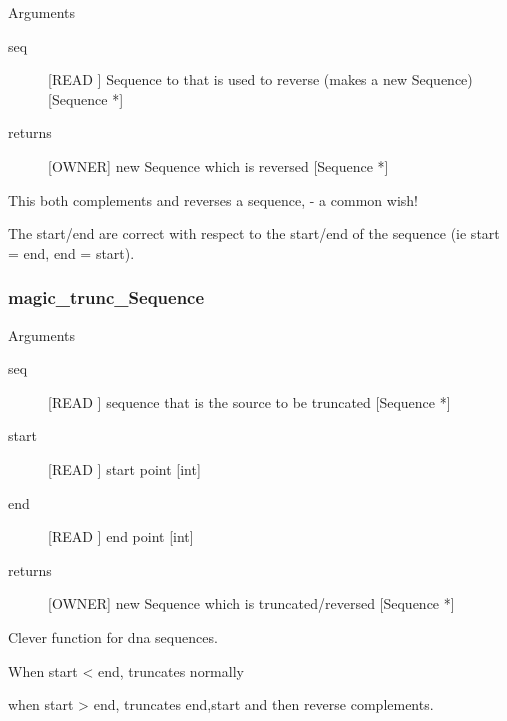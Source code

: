 Arguments
\begin{description}
\item[seq] [READ ] Sequence to that is used to reverse (makes a new Sequence) [Sequence *]
\item[returns] [OWNER] new Sequence which is reversed [Sequence *]
\end{description}
This both complements and reverses a sequence,
- a common wish!


The start/end are correct with respect to the start/end
of the sequence (ie start = end, end = start).


\subsubsection{magic_trunc_Sequence}

Arguments
\begin{description}
\item[seq] [READ ] sequence that is the source to be truncated [Sequence *]
\item[start] [READ ] start point [int]
\item[end] [READ ] end point [int]
\item[returns] [OWNER] new Sequence which is truncated/reversed [Sequence *]
\end{description}
Clever function for dna sequences.


When start < end, truncates normally


when start > end, truncates end,start and then
reverse complements.


